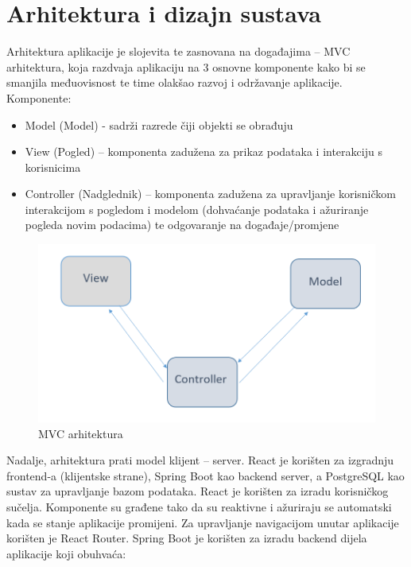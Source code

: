\chapter{Arhitektura i dizajn sustava}
		
	
	\noindent Arhitektura aplikacije je slojevita te zasnovana na događajima – MVC arhitektura, koja razdvaja aplikaciju na 3 osnovne komponente kako bi se smanjila međuovisnost te time olakšao razvoj i održavanje aplikacije. Komponente:
	
		\begin{itemize}
		\item Model (Model) - sadrži razrede čiji objekti se obrađuju
		\item View (Pogled) – komponenta zadužena za prikaz podataka i interakciju s korisnicima
		\item Controller (Nadglednik) – komponenta zadužena za upravljanje korisničkom interakcijom s pogledom i modelom (dohvaćanje podataka i ažuriranje pogleda novim podacima) te odgovaranje na događaje/promjene
		\end{itemize}
		
			\begin{figure}[H]
			\includegraphics[scale=0.45]{slike/MVC.PNG} %
			\centering
			\caption{MVC arhitektura}
			\label{fig:mvc} %
		\end{figure}

	\noindent Nadalje, arhitektura prati model klijent – server. 
	React je korišten za izgradnju frontend-a (klijentske strane), Spring Boot kao backend server, a PostgreSQL kao sustav za upravljanje bazom podataka.     React je korišten za izradu korisničkog sučelja. Komponente su građene tako da su reaktivne i ažuriraju se automatski kada se stanje aplikacije promijeni. Za upravljanje navigacijom unutar aplikacije korišten je React Router.
	Spring Boot je korišten za izradu backend dijela aplikacije koji obuhvaća:
	
